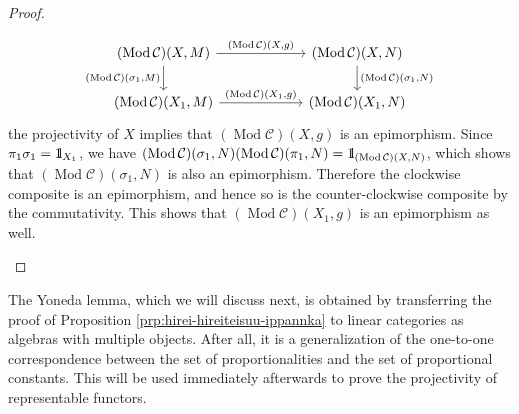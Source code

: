 \documentclass{surv-l}
\numberwithin{equation}{chapter}
\numberwithin{figure}{chapter}
\theoremstyle{plain}
\theoremstyle{definition}
\theoremstyle{remark}
\newcommand{\id}{1\kern-.25em{\text{{\rm l}}}}
\newcommand{\Ar}[3]{\ar[from={#1}, to={#2}, #3]}
\DeclareMathOperator{\Mod}{Mod}
\begin{document}
\begin{proof}
\begin{enumerate}[wide]
\[\begin{tikzcd}[column sep=6em]
(\Mod{\mathcal{C}})(X, M) & (\Mod{\mathcal{C}})(X,N)\\
(\Mod{\mathcal{C}})(X_1,M) & (\Mod{\mathcal{C}})(X_1,N)
\Ar{1-1}{1-2}{"{(\Mod{\mathcal{C}})(X,g)}"}
\Ar{1-2}{2-2}{"{(\Mod{\mathcal{C}})(\sigma_1,N)}"}
\Ar{1-1}{2-1}{"{(\Mod{\mathcal{C}})(\sigma_1,M)}" '}
\Ar{2-1}{2-2}{"{(\Mod{\mathcal{C}})(X_1,g)}"}
\end{tikzcd}
\]
the projectivity of $X$ implies that $(\Mod{\mathcal{C}})(X,g)$ is an epimorphism.
Since $\pi_1\sigma_1 = \id_{X_1}$, we have
$(\Mod{\mathcal{C}})(\sigma_1,N)(\Mod{\mathcal{C}})(\pi_1,N) = \id_{(\Mod{\mathcal{C}})(X,N)}$,
which shows that $(\Mod{\mathcal{C}})(\sigma_1,N)$ is also an epimorphism.
Therefore the clockwise composite is an epimorphism,
and hence so is the counter-clockwise composite by the commutativity.
This shows that $(\Mod{\mathcal{C}})(X_1,g)$ is an epimorphism as
well.
\end{enumerate}
\end{proof}

The Yoneda lemma, which we will discuss next, is obtained by transferring
the proof of Proposition \ref{prp:hirei-hireiteisuu-ippannka}
to linear categories as algebras with multiple objects.
After all, it is a generalization of the one-to-one correspondence between
the set of proportionalities and the set of proportional constants.
This will be used immediately afterwards to prove the projectivity of representable functors.
\end{document}
